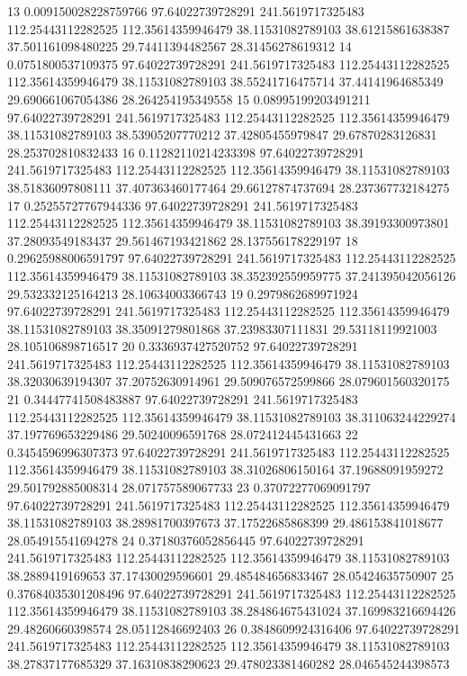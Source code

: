 {13 0.009150028228759766 97.64022739728291 241.5619717325483 112.25443112282525 112.35614359946479 38.11531082789103 38.61215861638387 37.501161098480225 29.74411394482567 28.31456278619312
14 0.0751800537109375 97.64022739728291 241.5619717325483 112.25443112282525 112.35614359946479 38.11531082789103 38.55241716475714 37.44141964685349 29.690661067054386 28.264254195349558
15 0.08995199203491211 97.64022739728291 241.5619717325483 112.25443112282525 112.35614359946479 38.11531082789103 38.53905207770212 37.42805455979847 29.67870283126831 28.253702810832433
16 0.11282110214233398 97.64022739728291 241.5619717325483 112.25443112282525 112.35614359946479 38.11531082789103 38.51836097808111 37.407363460177464 29.66127874737694 28.237367732184275
17 0.25255727767944336 97.64022739728291 241.5619717325483 112.25443112282525 112.35614359946479 38.11531082789103 38.39193300973801 37.28093549183437 29.561467193421862 28.137556178229197
18 0.29625988006591797 97.64022739728291 241.5619717325483 112.25443112282525 112.35614359946479 38.11531082789103 38.352392559959775 37.241395042056126 29.532332125164213 28.10634003366743
19 0.2979862689971924 97.64022739728291 241.5619717325483 112.25443112282525 112.35614359946479 38.11531082789103 38.35091279801868 37.23983307111831 29.53118119921003 28.105106898716517
20 0.3336937427520752 97.64022739728291 241.5619717325483 112.25443112282525 112.35614359946479 38.11531082789103 38.32030639194307 37.20752630914961 29.509076572599866 28.079601560320175
21 0.34447741508483887 97.64022739728291 241.5619717325483 112.25443112282525 112.35614359946479 38.11531082789103 38.311063244229274 37.197769653229486 29.50240096591768 28.072412445431663
22 0.3454596996307373 97.64022739728291 241.5619717325483 112.25443112282525 112.35614359946479 38.11531082789103 38.31026806150164 37.19688091959272 29.501792885008314 28.071757589067733
23 0.37072277069091797 97.64022739728291 241.5619717325483 112.25443112282525 112.35614359946479 38.11531082789103 38.28981700397673 37.17522685868399 29.486153841018677 28.054915541694278
24 0.37180376052856445 97.64022739728291 241.5619717325483 112.25443112282525 112.35614359946479 38.11531082789103 38.2889419169653 37.17430029596601 29.485484656833467 28.05424635750907
25 0.37684035301208496 97.64022739728291 241.5619717325483 112.25443112282525 112.35614359946479 38.11531082789103 38.284864675431024 37.169983216694426 29.48260660398574 28.05112846692403
26 0.3848609924316406 97.64022739728291 241.5619717325483 112.25443112282525 112.35614359946479 38.11531082789103 38.27837177685329 37.16310838290623 29.478023381460282 28.046545244398573
}
